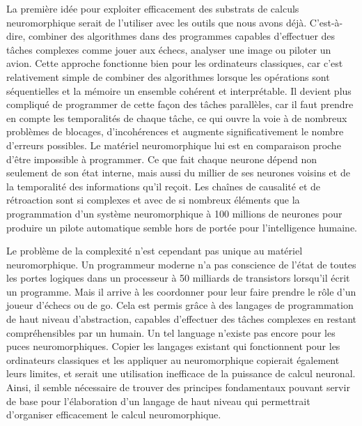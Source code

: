	La première idée pour exploiter efficacement des substrats de calculs neuromorphique serait de l'utiliser avec les outils que nous avons déjà. C'est-à-dire, combiner des algorithmes dans des programmes capables d'effectuer des tâches complexes comme jouer aux échecs, analyser une image ou piloter un avion. Cette approche fonctionne bien pour les ordinateurs classiques, car c'est relativement simple de combiner des algorithmes lorsque les opérations sont séquentielles et la mémoire un ensemble cohérent et interprétable. Il devient plus compliqué de programmer de cette façon des tâches parallèles, car il faut prendre en compte les temporalités de chaque tâche, ce qui ouvre la voie à de nombreux problèmes de blocages, d'incohérences et augmente significativement le nombre d'erreurs possibles. Le matériel neuromorphique lui est en comparaison proche d'être impossible à programmer. Ce que fait chaque neurone dépend non seulement de son état interne, mais aussi du millier de ses neurones voisins et de la temporalité des informations qu'il reçoit. Les chaînes de causalité et de rétroaction sont si complexes et avec de si nombreux éléments que la programmation d'un système neuromorphique à 100 millions de neurones pour produire un pilote automatique semble hors de portée pour l'intelligence humaine. 
	
	Le problème de la complexité n'est cependant pas unique au matériel neuromorphique. Un programmeur moderne n'a pas conscience de l'état de toutes les portes logiques dans un processeur à 50 milliards de transistors lorsqu'il écrit un programme. Mais il arrive à les coordonner pour leur faire prendre le rôle d'un joueur d'échecs ou de go. Cela est permis grâce à des langages de programmation de haut niveau d'abstraction, capables d'effectuer des tâches complexes en restant compréhensibles par un humain. Un tel language n'existe pas encore pour les puces neuromorphiques. Copier les langages existant qui fonctionnent pour les ordinateurs classiques et les appliquer au neuromorphique copierait également leurs limites, et serait une utilisation inefficace de la puissance de calcul neuronal. Ainsi, il semble nécessaire de trouver des principes fondamentaux pouvant servir de base pour l'élaboration d'un langage de haut niveau qui permettrait d'organiser efficacement le calcul neuromorphique.

